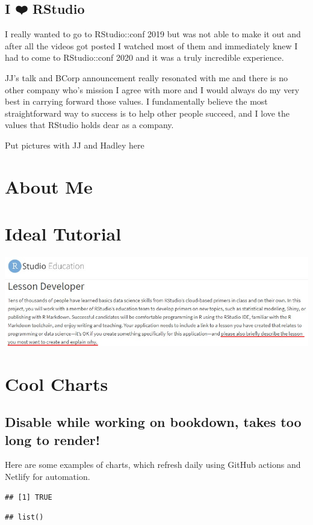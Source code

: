 \documentclass[
]{book}
\begin{document}
\hypertarget{rstudio}{%
\section{I ❤️ RStudio}\label{rstudio}}

I really wanted to go to RStudio::conf 2019 but was not able to make it out and after all the videos got posted I watched most of them and immediately knew I had to come to RStudio::conf 2020 and it was a truly incredible experience.

JJ's talk and BCorp announcement really resonated with me and there is no other company who's mission I agree with more and I would always do my very best in carrying forward those values. I fundamentally believe the most straightforward way to success is to help other people succeed, and I love the values that RStudio holds dear as a company.

Put pictures with JJ and Hadley here

\hypertarget{about-me}{%
\chapter{About Me}\label{about-me}}

\hypertarget{ideal-tutorial}{%
\chapter{Ideal Tutorial}\label{ideal-tutorial}}

\includegraphics{images/idealTutorial.png}

\hypertarget{cool-charts}{%
\chapter{Cool Charts}\label{cool-charts}}

\hypertarget{disable-while-working-on-bookdown-takes-too-long-to-render}{%
\section{Disable while working on bookdown, takes too long to render!}\label{disable-while-working-on-bookdown-takes-too-long-to-render}}

Here are some examples of charts, which refresh daily using GitHub actions and Netlify for automation.

\begin{verbatim}
## [1] TRUE
\end{verbatim}

\begin{verbatim}
## list()
\end{verbatim}

  
\end{document}
